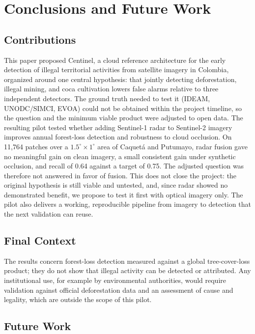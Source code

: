 \documentclass{article}
\begin{document}
\section{Conclusions and Future Work}
\label{sec:conclusions}

\subsection{Contributions}

This paper proposed Centinel, a cloud reference architecture for the early
detection of illegal territorial activities from satellite imagery in Colombia,
organized around one central hypothesis: that jointly detecting deforestation,
illegal mining, and coca cultivation lowers false alarms relative to three
independent detectors.
The ground truth needed to test it (IDEAM, UNODC/SIMCI, EVOA) could not be
obtained within the project timeline, so the question and the minimum viable
product were adjusted to open data.
The resulting pilot tested whether adding Sentinel-1 radar to Sentinel-2 imagery
improves annual forest-loss detection and robustness to cloud occlusion.
On 11{,}764 patches over a $1.5^\circ\times1^\circ$ area of Caquetá and
Putumayo, radar fusion gave no meaningful gain on clean imagery, a small
consistent gain under synthetic occlusion, and recall of 0.64 against a target
of 0.75.
The adjusted question was therefore not answered in favor of fusion.
This does not close the project: the original hypothesis is still viable and
untested, and, since radar showed no
demonstrated benefit, we propose to test it first with optical imagery only.
The pilot also delivers a working, reproducible pipeline from imagery to
detection that the next validation can reuse.

\subsection{Final Context}

The results concern forest-loss detection measured against a global
tree-cover-loss product; they do not show that illegal activity can be
detected or attributed.
Any institutional use, for example by environmental authorities, would require
validation against official deforestation data and an assessment of cause and
legality, which are outside the scope of this pilot.

\subsection{Future Work}
\end{document}
